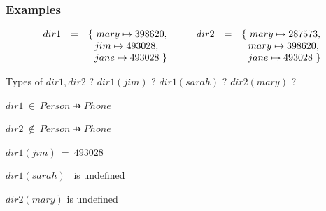 \documentclass{beamer}
\begin{document}
\begin{frame}

\frametitle{Examples}

\[
\begin{array}{rcl}
    dir1 & = &
    \{~  mary \mapsto 398620, \\
&&  ~~jim \mapsto 493028, \\
&&  ~~jane \mapsto 493028 ~\}
\end{array}
~~~~~~
\begin{array}{rcl}
    dir2 & = &
    \{~ mary \mapsto 287573, \\
&&  ~~mary \mapsto 398620, \\
&&  ~~jane \mapsto 493028 ~\}
\end{array}
\]

Types of $dir1, dir2$ ? \hspace{0.3cm} $dir1(jim)$ ? \hspace{0.3cm} 
$dir1(sarah)$ ? \hspace{0.3cm} $dir2(mary)$ ? 
~
\pause
~
\vspace{0.5cm}
\begin{description}  \setlength{\itemsep}{4pt}
\centering \item    $dir1 ~\in~ Person \pfun Phone$
\item $dir2 ~\not\in~ Person \pfun Phone$
\pause
 \item $dir1(jim) ~=~ 493028$ 
\item  $dir1(sarah)$ ~is undefined 
\item $dir2(mary)$ is undefined
\end{description}


\end{frame}
\end{document}
